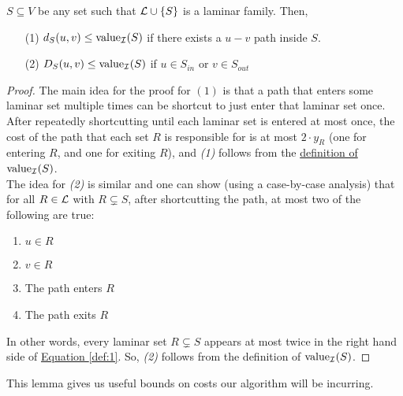 	\begin{lemma}\label{lemm:2:D-val} 
		$S\subseteq V$ be any set such that $\mathcal{L} \cup \{S\}$ is a laminar family. 
		Then,
		\begin{enumerate}
			\item[(1)] $d_S(u,v)\leq \textup{value}_{\mathcal{I}}(S)$ if there exists a $u-v$ path inside $S$.
			\item[(2)] $D_S(u,v)\leq \textup{value}_{\mathcal{I}}(S)$ if $u\in S_{in}$ or $v\in S_{out}$
		\end{enumerate}
	\end{lemma}
	\begin{proof}
		The main idea for the proof for $(1)$ is that a path that enters some laminar set multiple times can be shortcut to just enter that laminar set once. 
		After repeatedly shortcutting until each laminar set is entered at most once, the cost of the path that each set $R$ is responsible for is at most $2\cdot y_R$ (one for entering $R$, and one for exiting $R$), and \textit{(1)} follows from the \hyperref[def:value]{definition of $\textup{value}_{\mathcal{I}}(S)$}.\\
		The idea for \textit{(2)} is similar and one can show (using a case-by-case analysis) that for all $R\in \mathcal{L}$ with $R\subsetneq S$, after shortcutting the path, at most two of the following are true:
		\begin{enumerate}
			\item $u\in R$
			\item $v\in R$
			\item The path enters $R$
			\item The path exits $R$
		\end{enumerate}
		In other words, every laminar set $R\subsetneq S$ appears at most twice in the right hand side of \hyperref[def:1]{Equation \ref{def:1}}. So, \textit{(2)} follows from the definition of $\textup{value}_{\mathcal{I}}(S)$.
	\end{proof}
	
	This lemma gives us useful bounds on costs our algorithm will be incurring.

